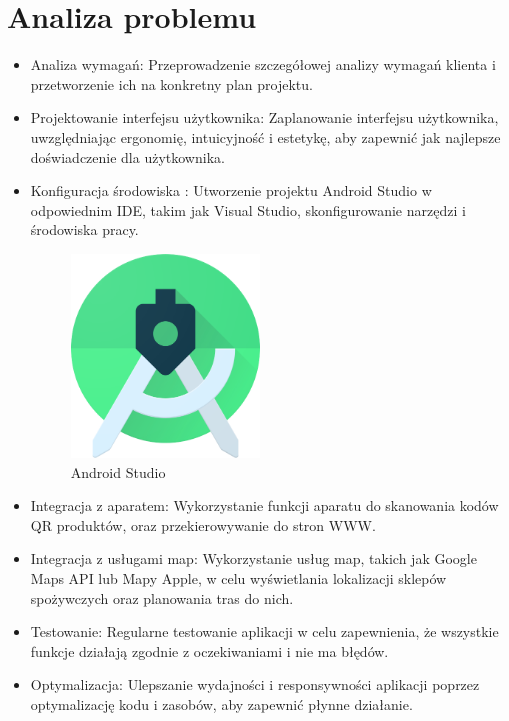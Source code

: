 \newpage
\section{Analiza problemu}
\begin{itemize}
	\item Analiza wymagań: Przeprowadzenie szczegółowej analizy wymagań klienta i przetworzenie ich na konkretny plan projektu.
	\item Projektowanie interfejsu użytkownika: Zaplanowanie interfejsu użytkownika, uwzględniając ergonomię, intuicyjność i estetykę, aby zapewnić jak najlepsze doświadczenie dla użytkownika.
	\item Konfiguracja środowiska : Utworzenie projektu Android Studio w odpowiednim IDE, takim jak Visual Studio, skonfigurowanie narzędzi i środowiska pracy.
	\begin{figure}[!hbt]
		\begin{center}
			\includegraphics[width=5cm]{rys/android-studio.png}
			\caption{Android Studio}
			\label{rys:ustawienia}
		\end{center}
	\end{figure}
	\item Integracja z aparatem: Wykorzystanie funkcji aparatu do skanowania kodów QR produktów, oraz przekierowywanie do stron WWW.
	\item Integracja z usługami map: Wykorzystanie usług map, takich jak Google Maps API lub Mapy Apple, w celu wyświetlania lokalizacji sklepów spożywczych oraz planowania tras do nich.
	\item Testowanie: Regularne testowanie aplikacji w celu zapewnienia, że wszystkie funkcje działają zgodnie z oczekiwaniami i nie ma błędów.
	\item Optymalizacja: Ulepszanie wydajności i responsywności aplikacji poprzez optymalizację kodu i zasobów, aby zapewnić płynne działanie.

\end{itemize} 